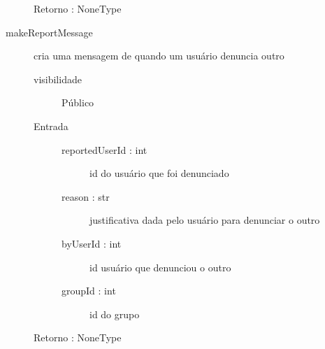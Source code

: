 \documentclass[a4paper]{article}
\begin{document}
\begin{description}
\begin{description}
				\item [Retorno : NoneType]
			\end{description} %
			
			\item [makeReportMessage] cria uma mensagem de quando um usuário denuncia outro
			\begin{description} %
				\item [visibilidade] Público
				\item [Entrada] \mbox{}
					\begin{description}
					 \item [reportedUserId : int] id do usuário que foi denunciado
					 \item [reason : str] justificativa dada pelo usuário para denunciar o outro
					 \item [byUserId : int] id usuário que denunciou o outro
					 \item [groupId : int] id do grupo
					\end{description}

				\item [Retorno : NoneType]
			\end{description} %
			
		\end{description} %
 
\end{document}
